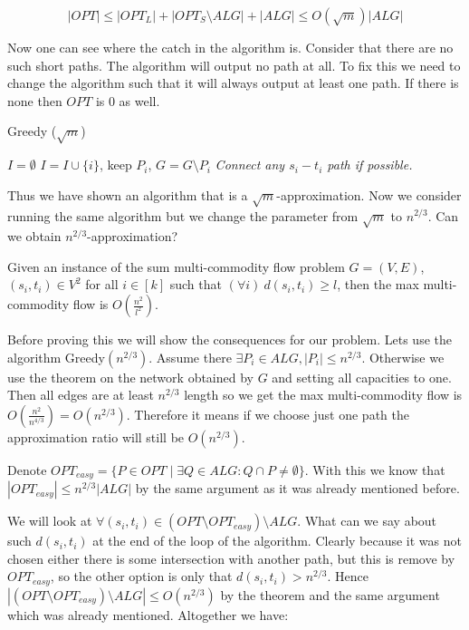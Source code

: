 $$
|OPT| \leq |OPT_{L}| + |OPT_{S} \setminus ALG| + |ALG| \leq O(\sqrt{m}) |ALG|
$$

Now one can see where the catch in the algorithm is. Consider that there are no such short paths. The algorithm will output no path at all. To fix this we need to change the algorithm such that it will always output at least one path. If there is none then $OPT$ is 0 as well.

\begin{algorithm}
	\caption{Greedy ($\sqrt{m}$)}
	\begin{algorithmic}[1]
		\State $I = \emptyset$
		\State $I = I \cup \{i\}$, keep $P_{i}$, $G = G \setminus P_{i}$
		\EndWhile
			\State \textit{Connect any $s_{i}-t_{i}$ path if possible.}
		\EndIf
	\end{algorithmic}
\end{algorithm}

Thus we have shown an algorithm that is a $\sqrt{m}$-approximation. Now we consider running the same algorithm but we change the parameter from $\sqrt{m}$ to $n^{2/3}$. Can we obtain $n^{2/3}$-approximation?

\begin{thm}
	\label{max flow bounded}
	Given an instance of the sum multi-commodity flow problem $G =(V,E)$, \newline $(s_{i}, t_{i}) \in V^2$ for all $i \in [k]$ such that $(\forall i) \ d(s_{i}, t_{i}) \geq l$, then the max multi-commodity flow is $O(\frac{n^2}{l^2})$.
\end{thm}

Before proving this we will show the consequences for our problem. Lets use the algorithm Greedy$(n^{2/3})$. Assume there $\exists P_{i} \in ALG, |P_{i}| \leq n^{2/3}$. Otherwise we use the theorem on the network obtained by $G$ and setting all capacities to one. Then all edges are at least $n^{2/3}$ length so we get the max multi-commodity flow is $O(\frac{n^{2}}{n^{4/3}}) = O(n^{2/3})$. Therefore it means if we choose just one path the approximation ratio will still be $O(n^{2/3})$.

Denote $OPT_{easy} = \{P \in OPT \mid \exists Q \in ALG : Q \cap P \neq \emptyset\}$. With this we know that $|OPT_{easy}| \leq n^{2/3} |ALG|$ by the same argument as it was already mentioned before.

We will look at $\forall (s_{i}, t_{i}) \in (OPT \setminus OPT_{easy}) \setminus ALG$. What can we say about such $d(s_{i}, t_{i})$ at the end of the loop of the algorithm. Clearly because it was not chosen either there is some intersection with another path, but this is remove by $OPT_{easy}$, so the other option is only that $d(s_{i}, t_{i}) > n^{2/3}$. Hence $|(OPT \setminus OPT_{easy}) \setminus ALG| \leq O(n^{2/3})$ by the theorem and the same argument which was already mentioned. Altogether we have:

